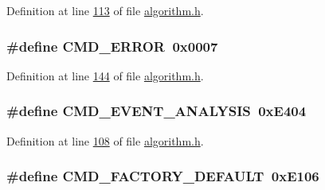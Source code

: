 Definition at line \hyperlink{a00021_source_l00113}{113} of file \hyperlink{a00021_source}{algorithm.\+h}.

\hypertarget{a00021_a1764a522e9c1a59a59be8757c69fa494}{
\subsubsection[{C\+M\+D\+\_\+\+E\+R\+R\+O\+R}]{\setlength{\rightskip}{0pt plus 5cm}\#define C\+M\+D\+\_\+\+E\+R\+R\+O\+R~0x0007}}\label{a00021_a1764a522e9c1a59a59be8757c69fa494}


Definition at line \hyperlink{a00021_source_l00144}{144} of file \hyperlink{a00021_source}{algorithm.\+h}.

\hypertarget{a00021_a3a15793e3ab7817f2429edf04de693a0}{
\subsubsection[{C\+M\+D\+\_\+\+E\+V\+E\+N\+T\+\_\+\+A\+N\+A\+L\+Y\+S\+I\+S}]{\setlength{\rightskip}{0pt plus 5cm}\#define C\+M\+D\+\_\+\+E\+V\+E\+N\+T\+\_\+\+A\+N\+A\+L\+Y\+S\+I\+S~0x\+E404}}\label{a00021_a3a15793e3ab7817f2429edf04de693a0}


Definition at line \hyperlink{a00021_source_l00108}{108} of file \hyperlink{a00021_source}{algorithm.\+h}.

\hypertarget{a00021_a8ad7dae51114833acbb665d703d8ffeb}{
\subsubsection[{C\+M\+D\+\_\+\+F\+A\+C\+T\+O\+R\+Y\+\_\+\+D\+E\+F\+A\+U\+L\+T}]{\setlength{\rightskip}{0pt plus 5cm}\#define C\+M\+D\+\_\+\+F\+A\+C\+T\+O\+R\+Y\+\_\+\+D\+E\+F\+A\+U\+L\+T~0x\+E106}}\label{a00021_a8ad7dae51114833acbb665d703d8ffeb}


